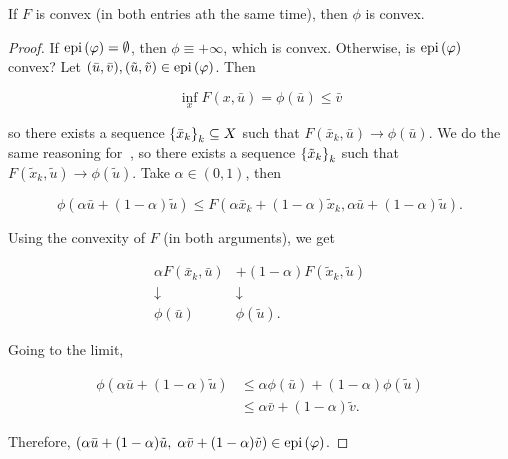 \begin{theorem}[Book 3.3.1(a)]
    
    If $F$ is convex (in both entries ath the same time), then $\phi$ is convex.

\end{theorem}

\begin{proof}
    
    If $\mathrm{epi}\left(\varphi\right) = \emptyset$, then $\phi \equiv +\infty$, which is convex. Otherwise, is $\mathrm{epi}\left(\varphi\right)$ convex? Let $(\bar{u},\bar{v}), (\tilde{u},\tilde{v}) \in \mathrm{epi}\left(\varphi\right)$. Then 

    \[ \inf_x  F(x,\bar{u}) = \phi(\bar{u}) \le \bar{v} \]

    so there exists a sequence $\left\{ \bar{x}_k \right\}_k \subseteq X$ such that $F(\bar{x}_k,\bar{u}) \to \phi(\bar{u})$.  We do the same reasoning for $~$, so there exists a sequence $\left\{ \tilde{x}_k \right\}_k$ such that $F(\tilde{x}_k,\tilde{u}) \to \phi(\tilde{u})$. Take $\alpha \in (0,1)$, then 

    \[ \phi(\alpha \bar{u} + (1-\alpha) \tilde{u}) \le F(\alpha \bar{x}_k + (1-\alpha)\tilde{x}_k, \alpha \bar{u} + (1-\alpha)\tilde{u}). \]

    Using the convexity of $F$ (in both arguments), we get

    \[
        \begin{array}{cc}
            \alpha F(\bar{x}_k,\bar{u}) &+(1-\alpha) F(\tilde{x}_k, \tilde{u})\\
            \downarrow &\downarrow \\
            \phi(\bar{u}) & \phi(\tilde{u}).
        \end{array}
    \]

    Going to the limit, 
    
    \begin{align*}
         \phi(\alpha \bar{u} + (1-\alpha)\tilde{u}) &\le \alpha \phi(\bar{u}) + (1-\alpha) \phi(\tilde{u}) \\
            &\le \alpha \bar{v} + (1-\alpha)\tilde{v}.
    \end{align*}

    Therefore, $(\alpha \bar{u} + (1-\alpha)\tilde{u},\; \alpha \bar{v} + (1-\alpha)\tilde{v}) \in \mathrm{epi}\left(\varphi\right)$.

\end{proof}

